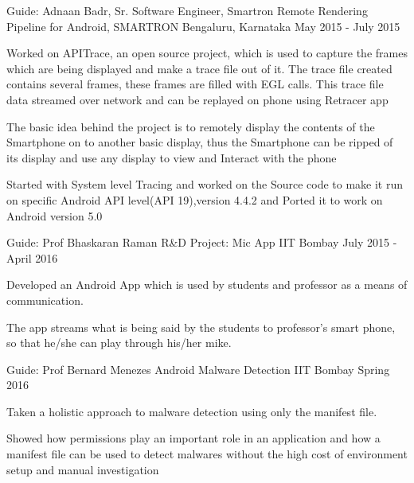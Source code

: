 \begin{cventries}
  \cventry
    {Guide: Adnaan Badr, Sr. Software Engineer, Smartron}
    {Remote Rendering Pipeline for Android, SMARTRON}
    {Bengaluru, Karnataka}
    {May 2015 - July 2015}
    {
      \begin{cvitems}
        \item {Worked on APITrace, an open source project, which is used to capture the frames which are being
               displayed and make a trace file out of it. The trace file created contains several frames, these frames are
               filled with EGL calls. This trace file data streamed over network and can be replayed on phone using
                Retracer app}
        \item {The basic idea behind the project is to remotely display the contents of the Smartphone on to another
basic display, thus the Smartphone can be ripped of its display and use any display to view and Interact
with the phone}
        \item {Started with System level Tracing and worked on the Source code to make it run on specific Android API
level(API 19),version 4.4.2 and Ported it to work on Android version 5.0}
      \end{cvitems}
    }
    
    
    
    
  \cventry
    {Guide: Prof Bhaskaran Raman}
    {R\&D Project: Mic App}
    {IIT Bombay}
    {July 2015 - April 2016}
    {
      \begin{cvitems}
        \item {Developed an Android App which is used by students and professor as a means of communication.}
        \item {The app streams what is being said by the students to professor’s smart phone, so that he/she can play
                through his/her mike.}
      \end{cvitems}
    }
    
     \cventry
    {Guide: Prof Bernard Menezes}
    {Android Malware Detection}
    {IIT Bombay}
    {Spring 2016}
    {
      \begin{cvitems}
        \item {Taken a holistic approach to malware detection using only the manifest file.}
        \item{Showed how permissions play an important role in an application and how a manifest file can be used to detect malwares without the high cost of environment setup and manual investigation}
      \end{cvitems}
    }
    

\end{cventries}
